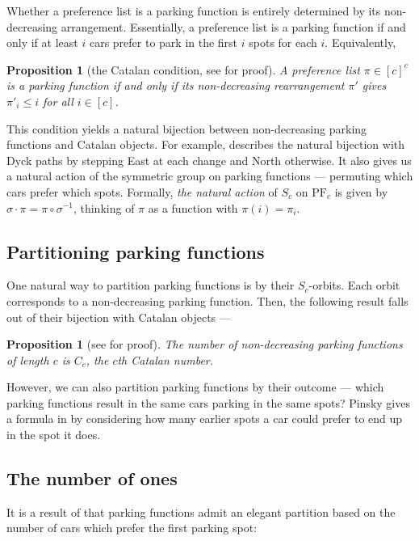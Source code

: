 \documentclass[12 pt]{amsart}
\newtheorem{proposition}[theorem]{Proposition}
\theoremstyle{definition} %
\theoremstyle{remark} %
\begin{document}
Whether a preference list is a parking function is entirely determined by its non-decreasing arrangement. Essentially, a preference list is a parking function if and only if at least $i$ cars prefer to park in the first $i$ spots for each $i$. Equivalently,

\begin{proposition}[the Catalan condition, see \cite{yan-survey-2015} for proof]
	A preference list $\pi \in [c]^{c}$ is a parking function if and only if its non-decreasing rearrangement $\pi'$ gives $\pi'_{i} \le i$ for all $i \in [c]$.
\end{proposition}

This condition yields a natural bijection between non-decreasing parking functions and Catalan objects. For example, \cite{armstrong-loehr-warrington-2016} describes the natural bijection with Dyck paths by stepping East at each change and North otherwise. It also gives us a natural action of the symmetric group on parking functions --- permuting which cars prefer which spots. Formally, \emph{the natural action} of $S_{c}$ on $\mathrm{PF}_{c}$ is given by $\sigma \cdot \pi = \pi \circ \sigma^{-1}$, thinking of $\pi$ as a function with $\pi(i) = \pi_i$. 

\subsection{Partitioning parking functions} One natural way to partition parking functions is by their $S_{c}$-orbits. Each orbit corresponds to a non-decreasing parking function. Then, the following result falls out of their bijection with Catalan objects ---
\begin{proposition}[see \cite{armstrong-loehr-warrington-2016} for proof]
	The number of non-decreasing parking functions of length $c$ is $C_{c}$, the $c$th Catalan number.
\end{proposition}

However, we can also partition parking functions by their outcome --- which parking functions result in the same cars parking in the same spots? Pinsky gives a formula in \cite{pinsky-2024} by considering how many earlier spots a car could prefer to end up in the spot it does.

\subsection{The number of ones}

It is a result of \cite{yan-survey-2015} that parking functions admit an elegant partition based on the number of cars which prefer the first parking spot:
\end{document}
